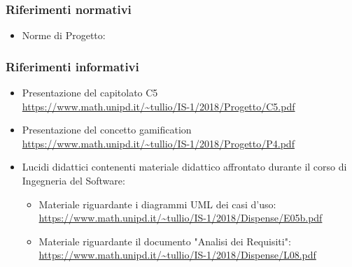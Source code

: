 \subsubsection{Riferimenti normativi}
\begin{itemize}
    \item Norme di Progetto: \NdP
    
\end{itemize}
\subsubsection{Riferimenti informativi}
\begin{itemize}
    \item Presentazione del capitolato C5
    \\ \url{https://www.math.unipd.it/~tullio/IS-1/2018/Progetto/C5.pdf}
    \item Presentazione del concetto gamification
    \\ \url{https://www.math.unipd.it/~tullio/IS-1/2018/Progetto/P4.pdf}
    \item Lucidi didattici contenenti materiale didattico affrontato durante il corso di Ingegneria del Software:
        \begin{itemize}
            \item Materiale riguardante i diagrammi UML dei casi d'uso:
            \\ \url{https://www.math.unipd.it/~tullio/IS-1/2018/Dispense/E05b.pdf}
            \item Materiale riguardante il documento "Analisi dei Requisiti":
            \\ \url{https://www.math.unipd.it/~tullio/IS-1/2018/Dispense/L08.pdf}
        \end{itemize}
        
    
\end{itemize}

